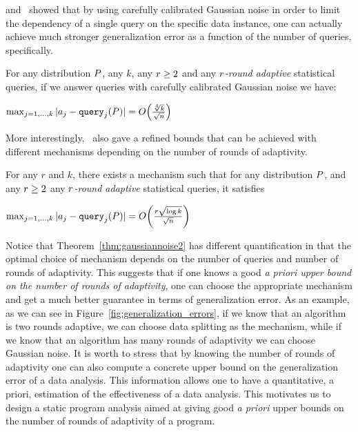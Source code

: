 \cite{DworkFHPRR15} and~\cite{BassilyNSSSU16} showed that by using carefully calibrated Gaussian noise in order to limit the dependency of a single query on the specific data instance, one 
can actually achieve much stronger generalization error as a function of the number of queries, specifically.
\begin{thm} \label{thm:gaussiannoise} For any distribution $P$, any $k$, any $r \geq 2$ and any \emph{$r$-round adaptive} statistical queries, if we answer queries with carefully calibrated Gaussian noise we have:
\begin{center}
  $
\max_{j=1,\dots,k} | \answer_j - \query_j(\dist) | = O\left( \frac{\sqrt[4]{k}}{\sqrt{n}}  \right)
$  
\end{center}
\end{thm}
More interestingly,~\cite{DworkFHPRR15}
also gave a refined bounds that can be achieved with different mechanisms depending on the number of rounds of adaptivity.   \begin{thm} \label{thm:gaussiannoise2} For any $r$ and $k$, there exists a mechanism such that for any distribution $P$, and any $r \geq 2$ any \emph{$r$-round adaptive} statistical queries, it satisfies
\begin{center}
  $
\max_{j=1,\dots,k} | \answer_j - \query_j(\dist) | = O\left( \frac{r \sqrt{\log k}}{\sqrt{n}}  \right)
$  
\end{center}
\end{thm}
Notice that Theorem~\ref{thm:gaussiannoise2} has different quantification in that the optimal choice of mechanism depends on the number of queries {and number of rounds of adaptivity}.  This suggests that if one knows a good \emph{a priori upper bound on the number of rounds of adaptivity}, one can choose the appropriate mechanism and get a much better guarantee in terms of generalization error.
As an example, as we can see in Figure~\ref{fig:generalization_errors}, if we know that an algorithm is two rounds adaptive, we can choose data splitting as {the} mechanism, while if we know that an algorithm has many rounds of adaptivity we can choose Gaussian noise. It is worth to stress that by knowing the number of rounds of adaptivity one can also compute a concrete upper bound on the generalization error of a data analysis. This information allows one to have a quantitative, a priori, estimation of the effectiveness of a data analysis. 
This motivates us to design a static program analysis aimed at giving good \emph{a priori} upper bounds on the number of rounds of adaptivity of a program. 



